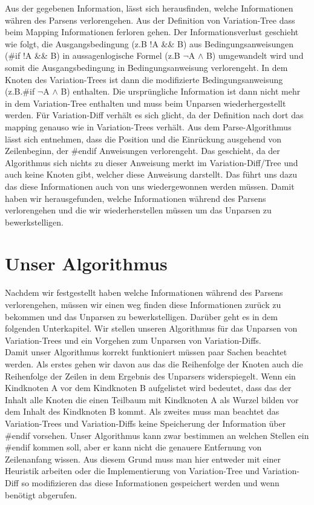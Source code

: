 Aus der gegebenen Information, lässt sich herausfinden, welche Informationen währen des Parsens verlorengehen. Aus der Definition von Variation-Tree dass beim Mapping Informationen ferloren gehen. Der Informationsverlust geschieht wie folgt, die Ausgangsbedingung (z.B !A \&\& B) aus Bedingungsanweisungen (\#if !A \&\& B) in aussagenlogische Formel (z.B $\lnot$A $\land$ B) umgewandelt wird und somit die Ausgangsbedingung in Bedingungsanweisung verlorengeht. In dem Knoten des Variation-Trees ist dann die modifizierte Bedingungsanweisung (z.B.\#if $\lnot$A $\land$ B) enthalten. Die ursprüngliche Information ist dann nicht mehr in dem Variation-Tree enthalten und muss beim Unparsen wiederhergestellt werden. Für Variation-Diff verhält es sich glicht, da der Definition nach dort das mapping genauso wie in Variation-Trees verhält. Aus dem Parse-Algorithmus lässt sich entnehmen, dass die Position und die Einrückung ausgehend von Zeilenbeginn, der \#endif Anweisungen verlorengeht. Das geschieht, da der Algorithmus sich nichts zu dieser Anweisung merkt im Variation-Diff/Tree und auch keine Knoten gibt, welcher diese Anweisung darstellt. Das führt uns dazu das diese Informationen auch von uns wiedergewonnen werden müssen. Damit haben wir herausgefunden, welche Informationen während des Parsens verlorengehen und die wir wiederherstellen müssen um das Unparsen zu bewerkstelligen.






\section{Unser Algorithmus}



Nachdem wir festgestellt haben welche Informationen während des Parsens verlorengehen, müssen wir einen weg finden diese Informationen zurück zu bekommen und das Unparsen zu bewerkstelligen. Darüber geht es in dem folgenden Unterkapitel. Wir stellen unseren Algorithmus für das Unparsen von Variation-Trees und ein Vorgehen zum Unparsen von Variation-Diffs.\\

Damit unser Algorithmus korrekt funktioniert müssen paar Sachen beachtet werden. Als erstes gehen wir davon aus das die Reihenfolge der Knoten auch die Reihenfolge der Zeilen in dem Ergebnis des Unparsers widerspiegelt. Wenn ein Kindknoten A vor dem Kindknoten B aufgelistet wird bedeutet, dass das der Inhalt alle Knoten die einen Teilbaum mit Kindknoten A als Wurzel bilden vor dem Inhalt des Kindknoten B kommt. Als zweites muss man beachtet das Variation-Trees und Variation-Diffs keine Speicherung der Information über \#endif vorsehen. Unser Algorithmus kann zwar bestimmen an welchen Stellen ein \#endif kommen soll, aber er kann nicht die genauere Entfernung von Zeilenanfang wissen. Aus diesem Grund muss man hier entweder mit einer Heuristik arbeiten oder die Implementierung von Variation-Tree und Variation-Diff so modifizieren das diese Informationen gespeichert werden und wenn benötigt abgerufen.



